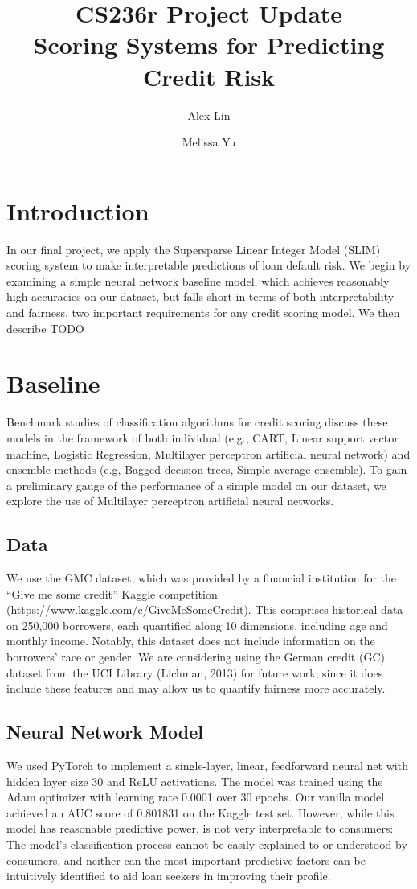 \documentclass[11pt, margin=1in]{article}
\begin{document}
	
\title{CS236r Project Update \\ Scoring Systems for Predicting Credit Risk}
\author{Alex Lin \and Melissa Yu}
\date{}
\maketitle

\section{Introduction}
In our final project, we apply the  Supersparse Linear Integer Model (SLIM) scoring system to make interpretable predictions of loan default risk. We begin by examining a simple neural network baseline model, which achieves reasonably high accuracies on our dataset, but falls short in terms of both interpretability and fairness, two important requirements for any credit scoring model. We then describe TODO

\section{Baseline}
Benchmark studies of classification algorithms for credit scoring discuss these models in the framework of both individual (e.g., CART, Linear support vector machine, Logistic Regression, Multilayer perceptron artificial neural network) and ensemble methods (e.g, Bagged decision trees, Simple average ensemble). To gain a preliminary gauge of the performance of a simple model on our dataset, we explore the use of Multilayer perceptron artificial neural networks.

\subsection{Data} 
We use the GMC dataset, which was provided by a financial institution for the ``Give me some credit'' Kaggle competition (\url{https://www.kaggle.com/c/GiveMeSomeCredit}). This comprises historical data on 250,000 borrowers, each quantified along 10 dimensions, including age and monthly income. Notably, this dataset does not include information on the borrowers' race or gender. We are considering using the German credit (GC) dataset from the UCI Library (Lichman, 2013) for future work, since it does include these features and may allow us to quantify fairness more accurately.

\subsection{Neural Network Model} 
We used PyTorch to implement a single-layer, linear, feedforward neural net with hidden layer size 30 and ReLU activations. The model was trained using the Adam optimizer with learning rate 0.0001 over 30 epochs. Our vanilla model achieved an AUC score of 0.801831 on the Kaggle test set. However, while this model has reasonable predictive power, is not very interpretable to consumers: The model's classification process cannot be easily explained to or understood by consumers, and neither can the most important predictive factors can be
intuitively identified to aid loan seekers in improving their profile. 
\end{document}
